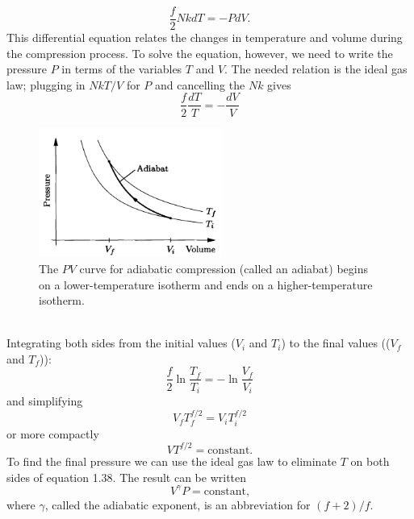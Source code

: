 \documentclass[11pt]{exam}
\begin{document}
\begin{equation}\tag{1.35}
\frac{f}{2}NkdT=-PdV. 
\end{equation}
This differential equation relates the changes in temperature and volume during the compression process. To solve the equation, however, we need to write the pressure $P$ in terms of the variables $T$ and $V$. The needed relation is the ideal gas law; plugging in $NkT/V$ for $P$ and cancelling the $Nk$ gives 
\begin{equation}\tag{1.36}
\frac{f}{2}\frac{dT}{T}=-\frac{dV}{V}    
\end{equation}
\begin{figure}[htp]
    \centering
    \includegraphics[width=6cm]{figure8.png}
    \caption{The $PV$ curve for adiabatic compression (called an adiabat) begins on a lower-temperature isotherm and ends on a higher-temperature isotherm.}
\label{fig:adiabat}
\end{figure}\\
\newpage
Integrating both sides from the initial values ($V_i$ and $T_i$) to the final values (($V_f$ and $T_f$)):
\begin{equation}\tag{1.37}
\frac{f}{2}\ln{\frac{T_f}{T_i}}=-\ln{\frac{V_f}{V_i}}
\end{equation}
and simplifying 
\begin{equation}\tag{1.38}
V_fT_f^{f/2}=V_iT_i^{f/2}
\end{equation}
or more compactly
\begin{equation}\tag{1.39}
VT^{f/2}=\text{constant.}
\end{equation}
To find the final pressure we can use the ideal gas law to eliminate $T$ on both sides of equation 1.38. The result can be written 
\begin{equation}\tag{1.40}
V^{\gamma}P= \text{constant,}
\end{equation}
where $\gamma$, called the adiabatic exponent, is an abbreviation for $(f+2)/f$.
\newpage
\end{document}
